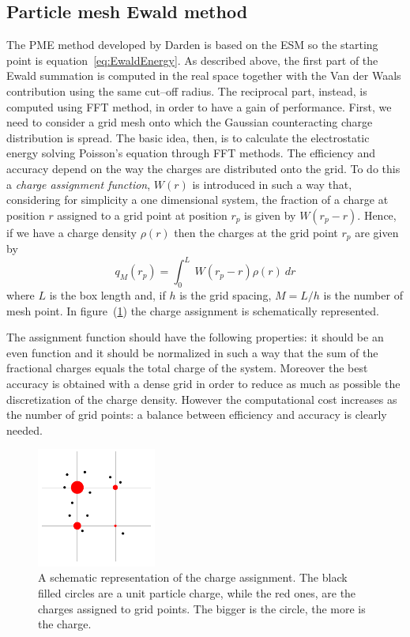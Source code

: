 \subsection{Particle mesh Ewald method}
The \acf{PME} method developed by Darden \etal{} \cite{DardenPME} is based on the \ac{ESM} so the starting point
is equation~\eqref{eq:EwaldEnergy}. As described above, the first part of the Ewald summation is computed in the
real space together with the Van der Waals contribution using the same cut--off radius. The reciprocal part,
instead, is computed using \ac{FFT} method, in order to have a gain of performance. First, we need to
consider a grid mesh onto which the Gaussian counteracting charge distribution is spread. The basic idea, then,
is to calculate the electrostatic energy solving Poisson's equation through \ac{FFT} methods. The efficiency and
accuracy depend on the way the charges are distributed onto the grid. To do this a \textit{charge assignment
function}, $W(r)$ is introduced in such a way that, considering for simplicity a one dimensional system, the 
fraction of a charge at position $r$ assigned to a grid point at position $r_p$ is given by $W(r_p - r)$. Hence, 
if we have a charge density $\rho(r)$ then the charges at the grid point $r_p$ are given by
\begin{equation}
	q_M(r_p) = \int_0^L\ W(r_p - r) \rho (r)\ dr
	\label{eq:meshAssign}
\end{equation}
where $L$ is the box length and, if $h$ is the grid spacing, $M = L/h$ is the number of mesh point. In
figure~(\ref{fig:gidAssign}) the charge assignment is schematically represented.

The assignment function should have the following properties: it should be an even function and it should be
normalized in such a way that the sum of the fractional charges equals the total charge of the system. Moreover
the best accuracy is obtained with a dense grid in order to reduce as much as possible the discretization of the
charge density. However the computational cost increases as the number of grid points: a balance between
efficiency and accuracy is clearly needed.
\begin{figure}
	\includegraphics[width=0.35\textwidth]{./img/gridCharge/gridCharge}
	\caption{A schematic representation of the charge assignment. The black filled circles are a unit particle charge, while the red ones, are the charges assigned to grid points. The bigger is the circle, the more is the charge.}
	\label{fig:gidAssign}
\end{figure}

